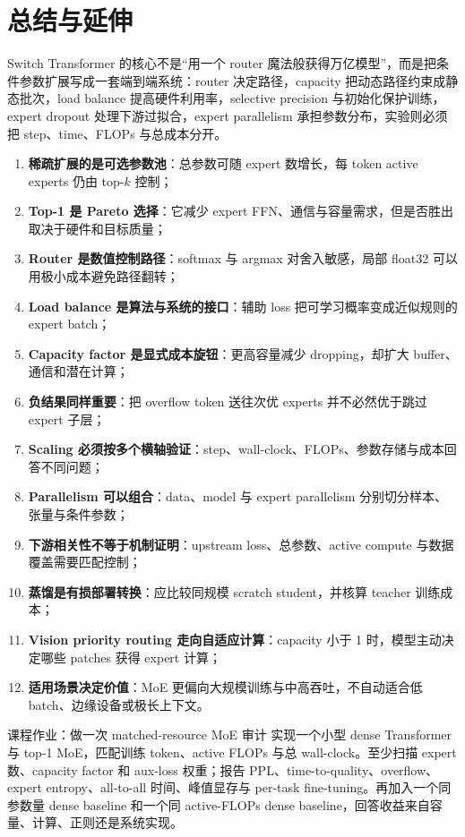 \section{总结与延伸}

Switch Transformer 的核心不是“用一个 router 魔法般获得万亿模型”，而是把条件参数扩展写成一套端到端系统：router 决定路径，capacity 把动态路径约束成静态批次，load balance 提高硬件利用率，selective precision 与初始化保护训练，expert dropout 处理下游过拟合，expert parallelism 承担参数分布，实验则必须把 step、time、FLOPs 与总成本分开。

\begin{enumerate}
  \item \textbf{稀疏扩展的是可选参数池}：总参数可随 expert 数增长，每 token active experts 仍由 top-$k$ 控制；
  \item \textbf{Top-1 是 Pareto 选择}：它减少 expert FFN、通信与容量需求，但是否胜出取决于硬件和目标质量；
  \item \textbf{Router 是数值控制路径}：softmax 与 argmax 对舍入敏感，局部 float32 可以用极小成本避免路径翻转；
  \item \textbf{Load balance 是算法与系统的接口}：辅助 loss 把可学习概率变成近似规则的 expert batch；
  \item \textbf{Capacity factor 是显式成本旋钮}：更高容量减少 dropping，却扩大 buffer、通信和潜在计算；
  \item \textbf{负结果同样重要}：把 overflow token 送往次优 experts 并不必然优于跳过 expert 子层；
  \item \textbf{Scaling 必须按多个横轴验证}：step、wall-clock、FLOPs、参数存储与成本回答不同问题；
  \item \textbf{Parallelism 可以组合}：data、model 与 expert parallelism 分别切分样本、张量与条件参数；
  \item \textbf{下游相关性不等于机制证明}：upstream loss、总参数、active compute 与数据覆盖需要匹配控制；
  \item \textbf{蒸馏是有损部署转换}：应比较同规模 scratch student，并核算 teacher 训练成本；
  \item \textbf{Vision priority routing 走向自适应计算}：capacity 小于 1 时，模型主动决定哪些 patches 获得 expert 计算；
  \item \textbf{适用场景决定价值}：MoE 更偏向大规模训练与中高吞吐，不自动适合低 batch、边缘设备或极长上下文。
\end{enumerate}

\begin{importantbox}{课程作业：做一次 matched-resource MoE 审计}
实现一个小型 dense Transformer 与 top-1 MoE，匹配训练 token、active FLOPs 与总 wall-clock。至少扫描 expert 数、capacity factor 和 aux-loss 权重；报告 PPL、time-to-quality、overflow、expert entropy、all-to-all 时间、峰值显存与 per-task fine-tuning。再加入一个同参数量 dense baseline 和一个同 active-FLOPs dense baseline，回答收益来自容量、计算、正则还是系统实现。
\end{importantbox}

